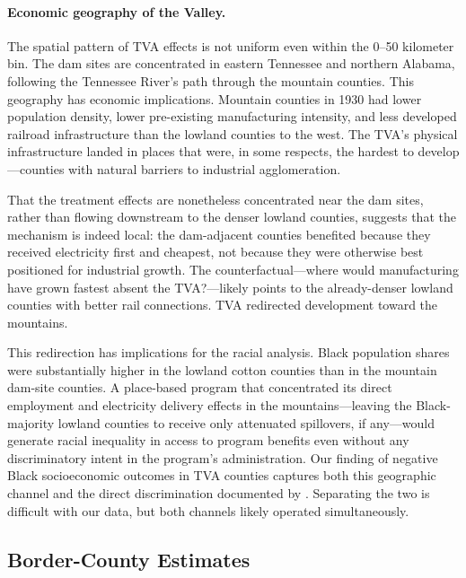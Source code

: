 \documentclass[12pt]{article}
\begin{document}
\paragraph{Economic geography of the Valley.} The spatial pattern of TVA effects is not uniform even within the 0--50 kilometer bin. The dam sites are concentrated in eastern Tennessee and northern Alabama, following the Tennessee River's path through the mountain counties. This geography has economic implications. Mountain counties in 1930 had lower population density, lower pre-existing manufacturing intensity, and less developed railroad infrastructure than the lowland counties to the west. The TVA's physical infrastructure landed in places that were, in some respects, the hardest to develop---counties with natural barriers to industrial agglomeration.

That the treatment effects are nonetheless concentrated near the dam sites, rather than flowing downstream to the denser lowland counties, suggests that the mechanism is indeed local: the dam-adjacent counties benefited because they received electricity first and cheapest, not because they were otherwise best positioned for industrial growth. The counterfactual---where would manufacturing have grown fastest absent the TVA?---likely points to the already-denser lowland counties with better rail connections. TVA redirected development toward the mountains.

This redirection has implications for the racial analysis. Black population shares were substantially higher in the lowland cotton counties than in the mountain dam-site counties. A place-based program that concentrated its direct employment and electricity delivery effects in the mountains---leaving the Black-majority lowland counties to receive only attenuated spillovers, if any---would generate racial inequality in access to program benefits even without any discriminatory intent in the program's administration. Our finding of negative Black socioeconomic outcomes in TVA counties captures both this geographic channel and the direct discrimination documented by \citet{grant1990}. Separating the two is difficult with our data, but both channels likely operated simultaneously.



\subsection{Border-County Estimates}
\end{document}
